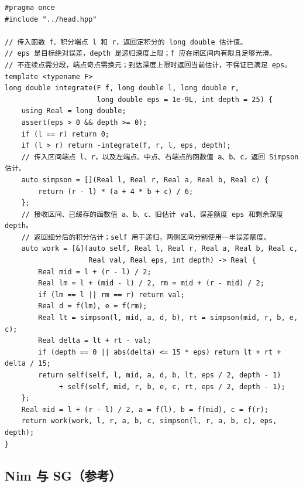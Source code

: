 \begin{lstlisting}
#pragma once
#include "../head.hpp"

// 传入函数 f、积分端点 l 和 r，返回定积分的 long double 估计值。
// eps 是目标绝对误差，depth 是递归深度上限；f 应在闭区间内有限且足够光滑。
// 不连续点需分段，端点奇点需换元；到达深度上限时返回当前估计，不保证已满足 eps。
template <typename F>
long double integrate(F f, long double l, long double r,
                      long double eps = 1e-9L, int depth = 25) {
    using Real = long double;
    assert(eps > 0 && depth >= 0);
    if (l == r) return 0;
    if (l > r) return -integrate(f, r, l, eps, depth);
    // 传入区间端点 l、r，以及左端点、中点、右端点的函数值 a、b、c，返回 Simpson 估计。
    auto simpson = [](Real l, Real r, Real a, Real b, Real c) {
        return (r - l) * (a + 4 * b + c) / 6;
    };
    // 接收区间、已缓存的函数值 a、b、c、旧估计 val、误差额度 eps 和剩余深度 depth。
    // 返回细分后的积分估计；self 用于递归，两侧区间分别使用一半误差额度。
    auto work = [&](auto self, Real l, Real r, Real a, Real b, Real c,
                    Real val, Real eps, int depth) -> Real {
        Real mid = l + (r - l) / 2;
        Real lm = l + (mid - l) / 2, rm = mid + (r - mid) / 2;
        if (lm == l || rm == r) return val;
        Real d = f(lm), e = f(rm);
        Real lt = simpson(l, mid, a, d, b), rt = simpson(mid, r, b, e, c);
        Real delta = lt + rt - val;
        if (depth == 0 || abs(delta) <= 15 * eps) return lt + rt + delta / 15;
        return self(self, l, mid, a, d, b, lt, eps / 2, depth - 1)
             + self(self, mid, r, b, e, c, rt, eps / 2, depth - 1);
    };
    Real mid = l + (r - l) / 2, a = f(l), b = f(mid), c = f(r);
    return work(work, l, r, a, b, c, simpson(l, r, a, b, c), eps, depth);
}
\end{lstlisting}

\subsection{Nim 与 SG（参考）}
\par


